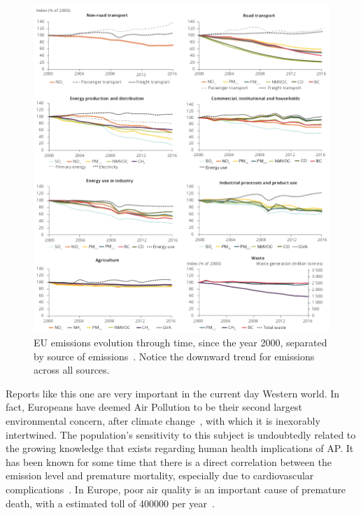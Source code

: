 \begin{figure}[htpb]
    \centering
    \includegraphics[width=\textwidth]{img/emissions.png}
    \caption{EU emissions evolution through time, since the year 2000,
    separated by source of emissions~\cite{EEA2016}. Notice the downward
    trend for emissions across all sources.}
    \label{fig:eu_chart_page}
\end{figure}

Reports like this one are very important in the current day Western
world. In fact, Europeans have deemed Air Pollution to be their second
largest environmental concern, after climate
change~\cite{TheEuropeanUnion2017}, with which it is inexorably
intertwined. The population's sensitivity to this subject is undoubtedly
related to the growing knowledge that exists regarding human health
implications of \gls{AP}. It has been known for some time that there is
a direct correlation between the emission level and premature mortality,
especially due to cardiovascular complications~\cite{Ghorani-Azam2016,
Carugno2016, Kampa2008, Kollanus2016}. In Europe, poor air quality is
an important cause of premature death, with a estimated toll of 400000
per year~\cite{EEA2016}.

